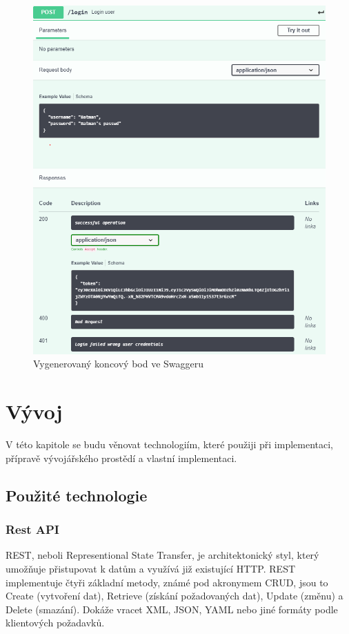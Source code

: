 \documentclass[thesis=B,czech]{FITthesis}[2012/06/26]
\begin{document}
        \begin{figure}[h!] \label{SwaggerGenerated}
            \includegraphics[width=\linewidth]{Swagger_generated_example}
            \caption{Vygenerovaný koncový bod ve Swaggeru}
        \end{figure}        

\chapter{Vývoj}
    V této kapitole se budu věnovat technologiím, které použiji při implementaci, přípravě vývojářského prostědí a vlastní implementaci.
    \section{Použité technologie}
        \subsection{Rest API}
        REST, neboli Representional State Transfer, je architektonický styl, který umožňuje přistupovat k datům a využívá již existující HTTP. REST implementuje čtyři základní metody, známé pod akronymem CRUD, jsou to
        Create (vytvoření dat), Retrieve (získání požadovaných dat), Update (změnu) a Delete (smazání). Dokáže vracet XML, JSON, YAML nebo jiné formáty podle klientových požadavků. \cite{rest}
        
\end{document}
